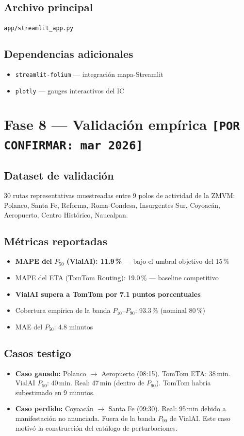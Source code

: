 \documentclass[11pt,a4paper]{article}
\begin{document}
\subsection{Archivo principal}
\texttt{app/streamlit\_app.py}

\subsection{Dependencias adicionales}
\begin{itemize}
  \item \texttt{streamlit-folium} --- integración mapa-Streamlit
  \item \texttt{plotly} --- gauges interactivos del IC
\end{itemize}

\section{Fase 8 --- Validación empírica \texttt{[POR CONFIRMAR: mar 2026]}}

\subsection{Dataset de validación}
30 rutas representativas muestreadas entre 9 polos de actividad de la ZMVM: Polanco, Santa Fe, Reforma, Roma-Condesa, Insurgentes Sur, Coyoacán, Aeropuerto, Centro Histórico, Naucalpan.

\subsection{Métricas reportadas}
\begin{itemize}
  \item \textbf{MAPE del $P_{50}$ (VialAI): 11.9\,\%} --- bajo el umbral objetivo del 15\,\%
  \item MAPE del ETA (TomTom Routing): 19.0\,\% --- baseline competitivo
  \item \textbf{VialAI supera a TomTom por 7.1 puntos porcentuales}
  \item Cobertura empírica de la banda $P_{10}$--$P_{90}$: 93.3\,\% (nominal 80\,\%)
  \item MAE del $P_{50}$: 4.8 minutos
\end{itemize}

\subsection{Casos testigo}
\begin{itemize}
  \item \textbf{Caso ganado:} Polanco $\rightarrow$ Aeropuerto (08:15). TomTom ETA: 38\,min. VialAI $P_{50}$: 40\,min. Real: 47\,min (dentro de $P_{90}$). TomTom habría subestimado en 9 minutos.
  \item \textbf{Caso perdido:} Coyoacán $\rightarrow$ Santa Fe (09:30). Real: 95\,min debido a manifestación no anunciada. Fuera de la banda $P_{90}$ de VialAI. Este caso motivó la construcción del catálogo de perturbaciones.
\end{itemize}
\end{document}
